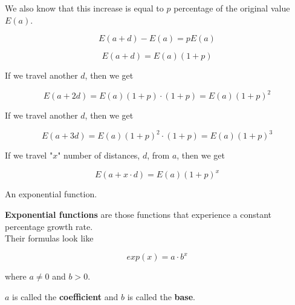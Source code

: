 \documentclass{ximera}
\begin{document}
We also know that this increase is equal to $p$ percentage of the original value $E(a)$.



\[
E(a+d) - E(a) = p E(a)
\]

\[
E(a+d) = E(a) (1+p)
\]

If we travel another $d$, then we get


\[
E(a + 2d) = E(a)(1+p) \cdot (1+p) = E(a) (1+p)^2
\]


If we travel another $d$, then we get


\[
E(a + 3d) = E(a)(1+p)^2 \cdot (1+p) = E(a) (1+p)^3
\]



If we travel "$x$" number of distances, $d$, from $a$, then we get

\[
E(a + x \cdot d) = E(a)(1+p)^x 
\]

An exponential function.



\begin{definition}
\textbf{Exponential functions} are those functions that experience a constant percentage growth rate. \\


Their formulas look like

\[
exp(x) = a \cdot b^x
\]


where $a \ne 0$ and $b > 0$.

$a$ is called the \textbf{coefficient} and $b$ is called the \textbf{base}.

\end{definition}
\end{document}
